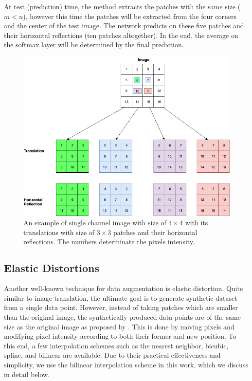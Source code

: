 At test (prediction) time, the method extracts the patches with the same size ($m < n$), however this time the
patches will be extracted from the four corners and the center of the test image. The network predicts on these
five patches and their horizontal reflections (ten patches altogether). In the end, the average
on the softmax layer will be determined by the final prediction.

\begin{figure}
  \centering
  \label{fig:label-preserving-trasformation}
  \includegraphics[width=1\textwidth]{fig/label-preserving-transformation}
  \caption{An example of single channel image with size of $4\times4$ with its translations with size of $3\times3$ patches and their horizontal reflections. The numbers determinate the pixels intensity.}
\end{figure}


\subsection{Elastic Distortions}
\label{tit:elastic-distrotion}
Another well-known technique for data augmentation is elastic distortion. Quite similar to image
translation, the ultimate goal is to generate synthetic dataset from a single data point. However, instead of
taking patches which are smaller than the original image, the synthetically produced data points are
of the same size as the original image as proposed by \cite{elastic_distortion_paper} . This is done by moving pixels and modifying pixel intensity
according to both their former and new position.  To this end, a few interpolation schemes such as
the nearest neighbor, bicubic, spline, and bilinear are available. Due to their practical
effectiveness and simplicity, we use the bilinear interpolation scheme in this work, which we
discuss in detail below.

